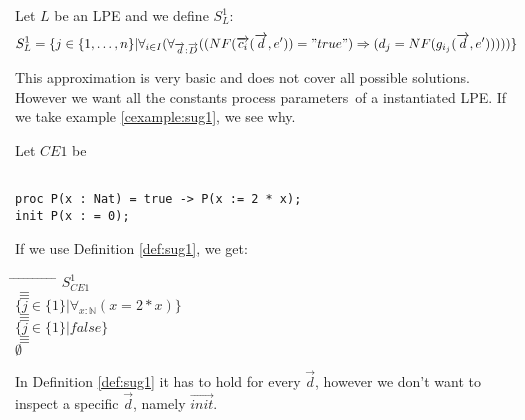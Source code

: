 \documentclass[a4paper,10pt]{article}
\theoremstyle{plain}
\theoremstyle{definition}
\newcommand{\lpe}{linear process equation}
\newcommand{\ovr}{\overrightarrow}
\newcommand{\pp}{process parameter}
\newcommand{\pps}{process parameters}
\begin{document}
\begin{defn} \label{def:sug1} Let $L$ be an LPE and we define $S_L^1$:
\begin{displaymath}
S_L^1 =
\lbrace   
j \in \lbrace 1, \ldots , n \rbrace \vert \forall_{i\in I} (\forall_{\ovr{d}: \ovr{D}}((NF(\ovr{c_i}(\ovr{d},e')) = "true")  \Rightarrow (d_j = NF(g_{i_j}(\ovr{d},e')))))\rbrace
\end{displaymath}

 
This approximation is very basic and does not cover all possible solutions. However we want all
the constants \pps\ of a instantiated LPE. If we take example
\ref{cexample:sug1}, we see why.
\begin{example}Let $CE1$ be \label{cexample:sug1}\begin{verbatim}

proc P(x : Nat) = true -> P(x := 2 * x);
init P(x : = 0);

\end{verbatim}
\end{example}
\begin{flushleft}
If we use Definition \ref{def:sug1}, we get:\\
\end{flushleft}
\begin{tabbing}
\hspace*{5.mm} \= \hspace*{5.mm} \= \hspace*{5.mm} \= \hspace*{5.mm} \= \hspace*{5.mm} \= \hspace*{5.mm}  \= \hspace*{5.mm}  \= \hspace*{5.mm}  \= \hspace*{5.mm} \= \hspace*{5.mm} \= \hspace*{5.mm}\kill
\> \> $S_{CE1}^1$\\
\> $\equiv$\\
\> \> $\lbrace j \in \lbrace 1 \rbrace \vert \forall_{x : \mathbb{N}}( x = 2 \ast x ) \rbrace $\\
\> $\equiv$ \\
\> \> $\lbrace j \in \lbrace 1 \rbrace \vert false \rbrace $\\
\> $\equiv$ \\
\> \> $\emptyset$ \\
\end{tabbing}
In Definition \ref{def:sug1} it has to hold for every $\ovr{d}$, however
we don't want to inspect a specific $\ovr{d}$, namely $\ovr{init}$.
\end{defn}
\end{document}
